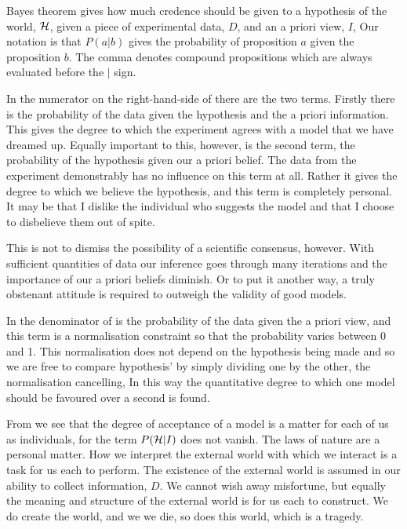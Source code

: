 Bayes theorem gives how much credence should be given to a hypothesis of
the world, ${\cal H}$,
given a piece of experimental data, $D$, and an a priori view, $I$,
Our notation is that $P(a|b)$ gives the probability of proposition $a$
given the proposition
$b$.
The comma denotes compound propositions which are always evaluated
before the $|$ sign.


In the numerator on the right-hand-side of  there are the
two terms.
Firstly there is the  probability of the data given the hypothesis and the a
priori information.
This gives the degree to which the experiment agrees with a model that
we have dreamed up.
Equally important to this, however,
is the second term, 
the probability of the hypothesis given our a priori belief.
The data from the experiment demonstrably has no influence
on this term at all.
Rather it gives the degree to which we believe the hypothesis,
and this term is completely personal.
It may be that I dislike the individual who suggests the model and that I
choose to disbelieve them out of spite.

This is not to dismiss the possibility of a scientific consensus, however.
With sufficient quantities of data our inference goes through many
iterations and the importance of our a priori beliefs diminish.
Or to put it another way,
a truly obstenant attitude is required to outweigh the validity of
good models.

In the denominator of  is  the probability of the data given the a priori view,
and this term is a normalisation constraint so that the  probability varies between
0 and 1.
This normalisation does not depend on the hypothesis being made and so
we are free to compare hypothesis' by simply dividing one by the
other, 
the normalisation cancelling,
In this way the quantitative degree to which one model should be favoured
over a second is found.

From  we see that the degree of acceptance
of a model is a matter for 
each of us as individuals, for 
the term $P({\cal H}|I)$ does not vanish.
The laws of nature are a personal matter.
How we interpret the external world with which we interact is a task for
us each to perform.
The existence of the external world is assumed in our ability to
collect information, $D$.
We cannot wish away misfortune,
but equally the meaning and structure of the external world is for us each
to construct. 
We do create the world, 
and we we die, so does this world, which is a tragedy.

